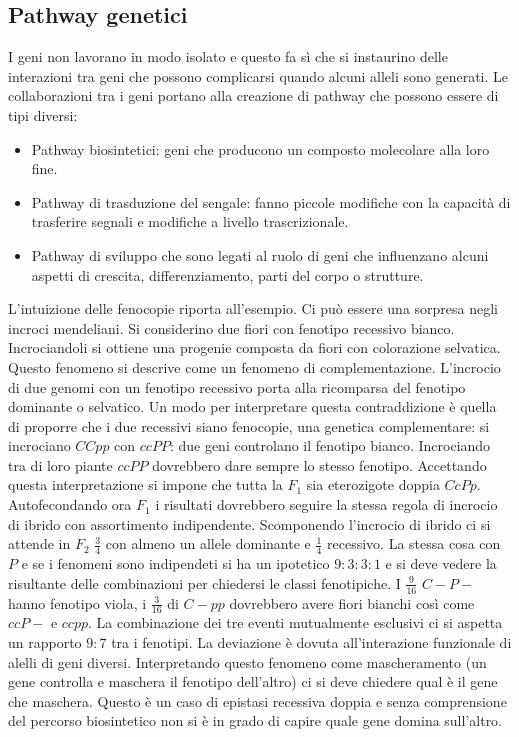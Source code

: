 \subsection{Pathway genetici}
I geni non lavorano in modo isolato e questo fa s\`i che si instaurino delle interazioni tra geni che possono complicarsi quando alcuni alleli sono generati. Le collaborazioni tra i 
geni portano alla creazione di pathway che possono essere di tipi diversi:
\begin{itemize}
	\item Pathway biosintetici: geni che producono un composto molecolare alla loro fine.
	\item Pathway di trasduzione del sengale: fanno piccole modifiche con la capacit\`a di trasferire segnali e modifiche a livello trascrizionale. 
	\item Pathway di sviluppo che sono legati al ruolo di geni che influenzano alcuni aspetti di crescita, differenziamento, parti del corpo o strutture. 
\end{itemize}
L'intuizione delle fenocopie riporta all'esempio. Ci pu\`o essere una sorpresa negli incroci mendeliani. Si considerino due fiori con fenotipo recessivo bianco. Incrociandoli si ottiene
una progenie composta da fiori con colorazione selvatica. Questo fenomeno si descrive come un fenomeno di complementazione. L'incrocio di due genomi con un fenotipo recessivo porta
alla ricomparsa del fenotipo dominante o selvatico. Un modo per interpretare questa contraddizione \`e quella di proporre che i due recessivi siano fenocopie, una genetica complementare:
si incrociano $CCpp$ con $ccPP$: due geni controlano il fenotipo bianco. Incrociando tra di loro piante $ccPP$ dovrebbero dare sempre lo stesso fenotipo. Accettando questa 
interpretazione si impone che tutta la $F_1$ sia eterozigote doppia $CcPp$. Autofecondando ora $F_1$ i risultati dovrebbero seguire la stessa regola di incrocio di ibrido con 
assortimento indipendente. Scomponendo l'incrocio di ibrido ci si attende in $F_2$ $\frac{3}{4}$ con almeno un allele dominante e $\frac{1}{4}$ recessivo. La stessa cosa con $P$ e
se i fenomeni sono indipendeti si ha un ipotetico $9:3:3:1$ e si deve vedere la risultante delle combinazioni per chiedersi le classi fenotipiche. I $\frac{9}{16}$ $C-P-$ hanno
fenotipo viola, i $\frac{3}{16}$ di $C-pp$ dovrebbero avere fiori bianchi cos\`i come $ccP-$ e $ccpp$. La combinazione dei tre eventi mutualmente esclusivi ci si aspetta un rapporto
$9:7$ tra i fenotipi. La deviazione \`e dovuta all'interazione funzionale di alelli di geni diversi. Interpretando questo fenomeno come mascheramento (un gene controlla e maschera il 
fenotipo dell'altro) ci si deve chiedere qual \`e il gene che maschera. Questo \`e un caso di epistasi recessiva doppia e senza comprensione del percorso biosintetico non si \`e in
grado di capire quale gene domina sull'altro. 

